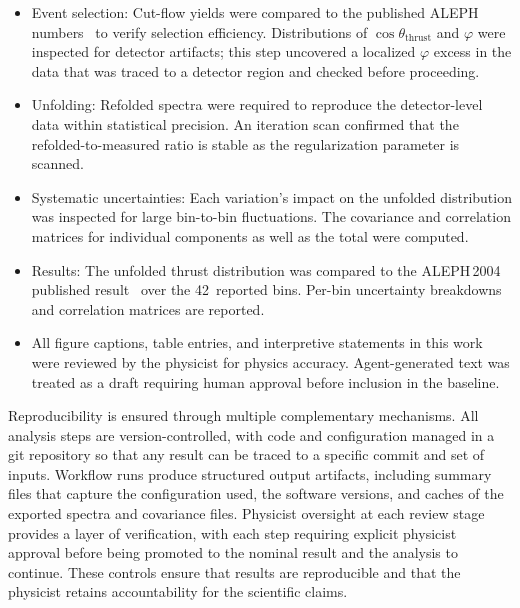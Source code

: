 \begin{itemize}
    \item Event selection: Cut-flow yields were compared to the published ALEPH numbers~\cite{Heister:2003aj} to verify selection efficiency. Distributions of $\cos\theta_{\mathrm{thrust}}$ and $\varphi$ were inspected for detector artifacts; this step uncovered a localized $\varphi$ excess in the data that was traced to a detector region and checked before proceeding.
    \item Unfolding: Refolded spectra were required to reproduce the detector-level data within statistical precision. An iteration scan confirmed that the refolded-to-measured ratio is stable as the regularization parameter is scanned.
    \item Systematic uncertainties: Each variation's impact on the unfolded distribution was inspected for large bin-to-bin fluctuations. The covariance and correlation matrices for individual components as well as the total were computed.
    \item Results: The unfolded thrust distribution was compared to the ALEPH\,2004 published result~\cite{Heister:2003aj} over the 42~reported bins. Per-bin uncertainty breakdowns and correlation matrices are reported.
    \item All figure captions, table entries, and interpretive statements in this work were reviewed by the physicist for physics accuracy. Agent-generated text was treated as a draft requiring human approval before inclusion in the baseline.
\end{itemize}

Reproducibility is ensured through multiple complementary mechanisms. All analysis steps are version-controlled, with code and configuration managed in a git repository so that any result can be traced to a specific commit and set of inputs. Workflow runs produce structured output artifacts, including summary files that capture the configuration used, the software versions, and caches of the exported spectra and covariance files. Physicist oversight at each review stage provides a layer of verification, with each step requiring explicit physicist approval before being promoted to the nominal result and the analysis to continue. These controls ensure that results are reproducible and that the physicist retains accountability for the scientific claims.
